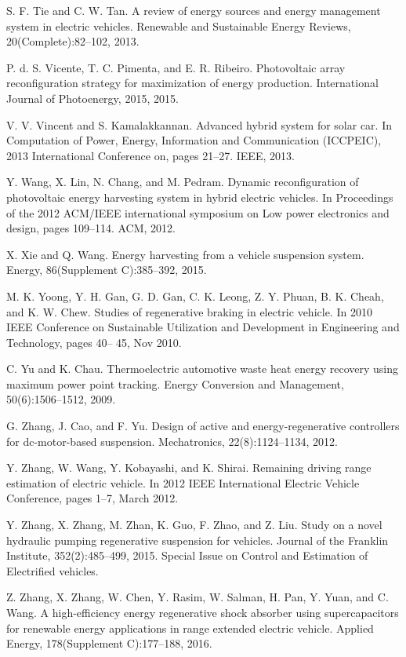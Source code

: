  S. F. Tie and C. W. Tan. A review of energy sources and energy management system in electric vehicles. Renewable and Sustainable Energy Reviews, 20(Complete):82--102, 2013.

 P. d. S. Vicente, T. C. Pimenta, and E. R. Ribeiro. Photovoltaic array reconfiguration strategy for maximization of energy production. International Journal of Photoenergy, 2015, 2015.

 V. V. Vincent and S. Kamalakkannan. Advanced hybrid system for solar car. In Computation of Power, Energy, Information and Communication (ICCPEIC), 2013 International Conference on, pages 21--27. IEEE, 2013.

 Y. Wang, X. Lin, N. Chang, and M. Pedram. Dynamic reconfiguration of photovoltaic energy harvesting system in hybrid electric vehicles. In Proceedings of the 2012 ACM/IEEE international symposium on Low power electronics and design, pages 109--114. ACM, 2012.

 X. Xie and Q. Wang. Energy harvesting from a vehicle suspension system. Energy, 86(Supplement C):385--392, 2015.

 M. K. Yoong, Y. H. Gan, G. D. Gan, C. K. Leong, Z. Y. Phuan, B. K. Cheah, and K. W. Chew. Studies of regenerative braking in electric vehicle. In 2010 IEEE Conference on Sustainable Utilization and Development in Engineering and Technology, pages 40-- 45, Nov 2010.

 C. Yu and K. Chau. Thermoelectric automotive waste heat energy recovery using maximum power point tracking. Energy Conversion and Management, 50(6):1506--1512, 2009.

 G. Zhang, J. Cao, and F. Yu. Design of active and energy-regenerative controllers for dc-motor-based suspension. Mechatronics, 22(8):1124--1134, 2012.

 Y. Zhang, W. Wang, Y. Kobayashi, and K. Shirai. Remaining driving range estimation of electric vehicle. In 2012 IEEE International Electric Vehicle Conference, pages 1--7, March 2012.

 Y. Zhang, X. Zhang, M. Zhan, K. Guo, F. Zhao, and Z. Liu. Study on a novel hydraulic pumping regenerative suspension for vehicles. Journal of the Franklin Institute, 352(2):485--499, 2015. Special Issue on Control and Estimation of Electrified vehicles.

 Z. Zhang, X. Zhang, W. Chen, Y. Rasim, W. Salman, H. Pan, Y. Yuan, and C. Wang. A high-efficiency energy regenerative shock absorber using supercapacitors for renewable energy applications in range extended electric vehicle. Applied Energy, 178(Supplement C):177--188, 2016.

